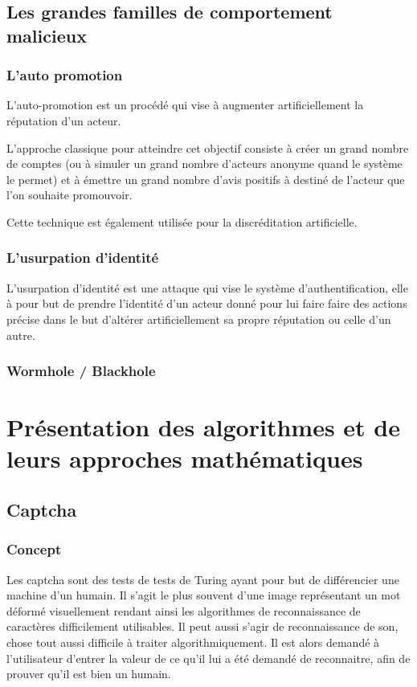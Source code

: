 \documentclass[a4paper, 11pt]{article} %
\begin{document}
\subsection{Les grandes familles de comportement malicieux}
\subsubsection{L'auto promotion}
L'auto-promotion est un procédé qui vise à augmenter artificiellement la réputation
d'un acteur.

L'approche classique pour atteindre cet objectif consiste à créer un grand nombre
de comptes (ou à simuler un grand nombre d'acteurs anonyme quand le système le permet)
et à émettre un grand nombre d'avis positifs à destiné de l'acteur que l'on souhaite
promouvoir.

Cette technique est également utilisée pour la discréditation artificielle.

\subsubsection{L'usurpation d'identité}
L'usurpation d'identité est une attaque qui vise le système d'authentification,
elle à pour but de prendre l'identité d'un acteur donné pour lui faire faire des
actions précise dans le but d'altérer artificiellement sa propre réputation ou celle
d'un autre.

\subsubsection{Wormhole / Blackhole}

\section{Présentation des algorithmes et de leurs approches mathématiques}
\subsection{Captcha}
\subsubsection{Concept}
Les captcha sont des tests de tests de Turing ayant pour but de différencier une machine d'un humain.
Il s'agit le plus souvent d'une image représentant un mot déformé visuellement rendant ainsi les algorithmes de reconnaissance de caractères difficilement utilisables.
Il peut aussi s'agir de reconnaissance de son, chose tout aussi difficile à traiter algorithmiquement.
Il est alors demandé à l'utilisateur d'entrer la valeur de ce qu'il lui a été demandé de reconnaitre, afin de prouver qu'il est bien un humain.
\end{document}
